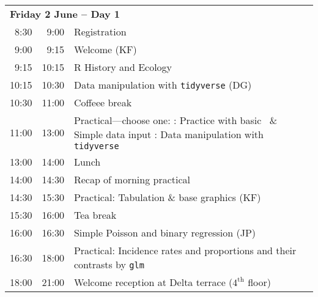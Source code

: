 \noindent
\begin{tabular}{r@{ -- }rp{13cm}}
\multicolumn{3}{l}{\bf Friday 2 June -- Day 1} \\
 8:30 &  9:00 & Registration \\
 9:00 &  9:15 & Welcome (KF) \\
 9:15 & 10:15 & R History and Ecology\\%
10:15 & 10:30 & Data manipulation with \texttt{tidyverse} (DG) \\
10:30 & 11:00 & Coffeee break \\
11:00 & 13:00 & Practical---choose one: \newline
                1: Practice with basic \R\ \& Simple data input \newline
                2: Data manipulation with \texttt{tidyverse} \\

  
13:00 & 14:00 & Lunch \\
14:00 & 14:30 & Recap of morning practical \\
14:30 & 15:30 & Practical: Tabulation \& base graphics (KF)\\ %
15:30 & 16:00 & Tea break\\
16:00 & 16:30 & Simple Poisson and binary regression (JP)\\ %
16:30 & 18:00 & Practical: Incidence rates and proportions and their contrasts by \texttt{glm}\\
18:00 & 21:00 & Welcome reception at Delta terrace ($4^\text{th}$ floor) \\[1em]
\end{tabular}

